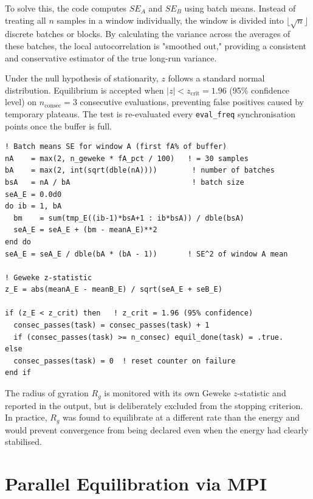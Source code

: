 \documentclass[11pt, a4paper]{article}
\begin{document}
To solve this, the code computes $SE_A$ and $SE_B$ using batch means. 
Instead of treating all $n$ samples in a window individually, the window is 
divided into $\lfloor\sqrt{n}\rfloor$ discrete batches or blocks. By calculating 
the variance across the averages of these batches, the local autocorrelation is 
"smoothed out," providing a consistent and conservative estimator of the true 
long-run variance.

Under the null hypothesis of stationarity, $z$ follows a standard normal
distribution. Equilibrium is accepted when $|z| < z_{\text{crit}} = 1.96$
(95\% confidence level) on $n_{\text{consec}} = 3$ consecutive evaluations,
preventing false positives caused by temporary plateaus. The test is re-evaluated
every \texttt{eval\_freq} synchronisation points once the buffer is full.

\begin{lstlisting}[caption={Batch-means SE and Geweke $z$-statistic.}]
! Batch means SE for window A (first fA% of buffer)
nA    = max(2, n_geweke * fA_pct / 100)   ! = 30 samples
bA    = max(2, int(sqrt(dble(nA))))        ! number of batches
bsA   = nA / bA                            ! batch size
seA_E = 0.0d0
do ib = 1, bA
  bm    = sum(tmp_E((ib-1)*bsA+1 : ib*bsA)) / dble(bsA)
  seA_E = seA_E + (bm - meanA_E)**2
end do
seA_E = seA_E / dble(bA * (bA - 1))       ! SE^2 of window A mean

! Geweke z-statistic
z_E = abs(meanA_E - meanB_E) / sqrt(seA_E + seB_E)

if (z_E < z_crit) then   ! z_crit = 1.96 (95% confidence)
  consec_passes(task) = consec_passes(task) + 1
  if (consec_passes(task) >= n_consec) equil_done(task) = .true.
else
  consec_passes(task) = 0  ! reset counter on failure
end if
\end{lstlisting}

The radius of gyration $R_g$ is monitored with its own Geweke $z$-statistic and
reported in the output, but is deliberately excluded from the stopping criterion.
In practice, $R_g$ was found to equilibrate at a different rate than the energy
and would prevent convergence from being declared even when the energy had
clearly stabilised.

\newpage
\section{Parallel Equilibration via MPI}
\label{sec:mpi}
\end{document}
